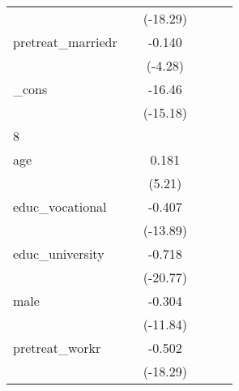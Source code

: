 {\begin{tabular}{l*{5}{c}}
            &                     &    (-18.29)         &                     &                     &                     \\
[1em]
pretreat\_marriedr&                     &      -0.140\sym{***}&                     &                     &                     \\
            &                     &     (-4.28)         &                     &                     &                     \\
[1em]
\_cons      &                     &      -16.46\sym{***}&                     &                     &                     \\
            &                     &    (-15.18)         &                     &                     &                     \\
\hline
8           &                     &                     &                     &                     &                     \\
age         &                     &       0.181\sym{***}&                     &                     &                     \\
            &                     &      (5.21)         &                     &                     &                     \\
[1em]
educ\_vocational&                     &      -0.407\sym{***}&                     &                     &                     \\
            &                     &    (-13.89)         &                     &                     &                     \\
[1em]
educ\_university&                     &      -0.718\sym{***}&                     &                     &                     \\
            &                     &    (-20.77)         &                     &                     &                     \\
[1em]
male        &                     &      -0.304\sym{***}&                     &                     &                     \\
            &                     &    (-11.84)         &                     &                     &                     \\
[1em]
pretreat\_workr&                     &      -0.502\sym{***}&                     &                     &                     \\
            &                     &    (-18.29)         &                     &                     &                     \\

\end{tabular}}
